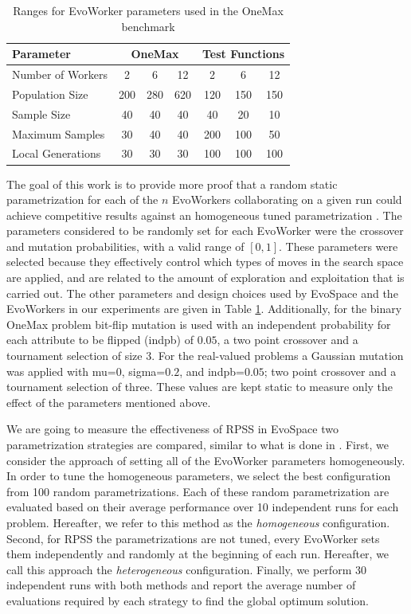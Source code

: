 \documentclass[conference]{IEEEtran}
\begin{document}
\begin{table}[!t]
\caption{Ranges for EvoWorker parameters used in the OneMax benchmark}
\label{tab:params}
\centering
\begin{tabular}{|l|c|c|c|c|c|c| }
\hline
\textbf{Parameter} & \multicolumn{3}{|c|}{OneMax} & \multicolumn{3}{|c|}{Test Functions} \\
\hline
Number of Workers & 2 & 6 & 12 & 2 & 6 & 12\\
\hline
\hline
Population Size & 200 & 280 & 620 & 120 & 150 & 150\\
\hline
Sample Size & 40 & 40 & 40 & 40 & 20 & 10\\
\hline
Maximum Samples & 30 & 40 & 40 & 200 & 100 & 50\\
\hline
Local Generations & 30 & 30 & 30 & 100 & 100 & 100\\
\hline
\end{tabular}
\end{table}
%
The goal of this work is to provide more proof that a random static parametrization for each of the $n$ EvoWorkers
collaborating on a given run could achieve competitive results against an homogeneous tuned parametrization
\cite{fuku1,fuku2,LNCS86720702}. The parameters considered to be randomly set for each EvoWorker
were the crossover and mutation probabilities, with a valid range of $[0,1]$. These parameters were
selected because they effectively control which types of moves in the search space are
applied, and are related to the amount of exploration and exploitation
that is carried out. %
The other parameters and design choices used by EvoSpace and the EvoWorkers in our experiments are given in
Table \ref{tab:params}. Additionally, for the binary OneMax problem bit-flip mutation
is used with an independent probability for each attribute to be flipped (indpb) of $0.05$,
a two point crossover and a tournament selection of size 3. For the real-valued problems a Gaussian
mutation was applied with mu=$0$, sigma=$0.2$, and indpb=$0.05$; two point crossover and
a tournament selection of three. These values are kept static to measure only the effect of the
parameters mentioned above.

We are going to measure the effectiveness of RPSS in EvoSpace two parametrization strategies are compared,
similar to what is done in \cite{fuku1,fuku2,LNCS86720702}. First, we consider the approach of setting all
of the EvoWorker parameters homogeneously. In order to tune the homogeneous parameters,
we select the best configuration from 100 random parametrizations.
Each of these random parametrization are evaluated based on their average performance over 10
independent runs for each problem.
Hereafter, we refer to this method as the {\em homogeneous} configuration.
Second, for RPSS the parametrizations
are not tuned, every EvoWorker sets them independently and randomly at the beginning of each run.
Hereafter, we call this approach the {\em heterogeneous} configuration. Finally, we perform 30 independent runs
with both methods and report the average number of evaluations required by each strategy to find the
global optimum solution.
\end{document}

